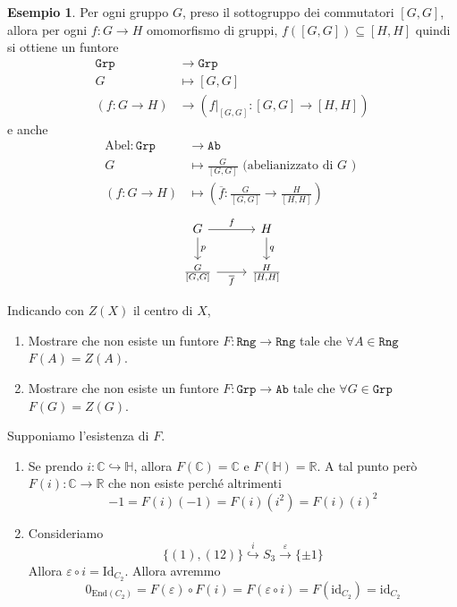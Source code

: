 \documentclass[notitlepage]{report}
\newcounter{theo}[section]\setcounter{theo}{0}
\newcounter{excounter}[section]\setcounter{excounter}{0}
\numberwithin{equation}{section}
\theoremstyle{plain}
\theoremstyle{definition}
\newtheorem{example}[excounter]{Esempio}
\theoremstyle{remark}
\begin{document}
\begin{example}{}
    Per ogni gruppo \(G\), preso il sottogruppo dei commutatori \([G, G]\),
    allora per ogni \(f : G \to H\) omomorfismo di gruppi, \(f{([G, G])} \subseteq [H, H] \) 
    quindi si ottiene un funtore
    \begin{align*}{}
        \mathtt{Grp} &\to \mathtt{Grp} \\
        G &\mapsto [G, G] \\
        {(f : G \to H)} &\to {(f |_{[G, G]} : [G, G] \to [H, H] )}
    \end{align*}
    e anche 
    \begin{align*}
        \mathrm{Abel} : \mathtt{Grp} &\to \mathtt{Ab} \\
        G &\mapsto \frac{G}{[G, G]} \text{ (abelianizzato di \(G\) ) } \\
        {(f : G \to H)} &\mapsto {\left(\overline{f} : \frac{G}{[G,G]} \to \frac{H}{[H,H]}\right)}
    \end{align*}
\[\begin{tikzcd}
	{G} & {H} \\
    {\frac{G}{[G,G]}} & {\frac{H}{[H,H]}}
	\arrow["f", from=1-1, to=1-2]
	\arrow["{p}", from=1-1, to=2-1]
	\arrow["{q}", from=1-2, to=2-2]
	\arrow["\overline{f}"', from=2-1, to=2-2]
\end{tikzcd}\]
\end{example}

\begin{eser}{}
    Indicando con \(Z{(X)}\) il centro di \(X\),

\begin{enumerate}[label = \alph*.]
    \item Mostrare che non esiste un funtore \(F : \mathtt{Rng} \to \mathtt{Rng}\) tale
    che \(\forall A \in \mathtt{Rng}\) \(F{(A)} = Z{(A)}\).
    \item Mostrare che non esiste un funtore \(F : \mathtt{Grp} \to \mathtt{Ab}\) tale
    che \(\forall G \in \mathtt{Grp}\) \(F{(G)} = Z{(G)}\).
\end{enumerate}
    \tcblower
    Supponiamo l'esistenza di \(F\).
\begin{enumerate}[label = \alph*.]
    \item Se prendo \(i : \mathbb{C} \hookrightarrow \mathbb{H}\),
        allora \(F{(\mathbb{C})} = \mathbb{C} \) e \(F{(\mathbb{H})} = \mathbb{R}\). A tal punto però \(
        F{(i)} : \mathbb{C} \to \mathbb{R}\) che non esiste perché altrimenti \[-1 = F{(i)}{(-1)} = F{(i)}{(i^2)} = F{(i)}{(i)}^2\]
    \item Consideriamo
        \[
          \{(1), (12)\} \overset{i}{\hookrightarrow } S_{3} \overset{\varepsilon}{\to } \{\pm 1\} 
        \]
        Allora \(\varepsilon \circ i = \mathrm{Id}_{C_{2}} \). Allora avremmo
        \[
          0_{\mathrm{End}{(C_{2})}}  = F{(\varepsilon)} \circ F{(i)} = F{(\varepsilon \circ i)} = F{(\mathrm{id}_{C_{2}})} = \mathrm{id}_{C_{2}}
        \]
\end{enumerate}

\end{eser}
\end{document}
